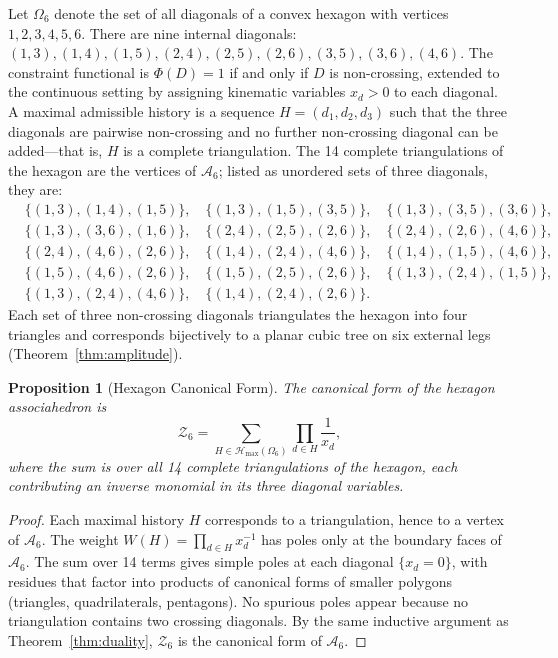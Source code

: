 \documentclass[11pt]{article}
\theoremstyle{plain}
\newtheorem{proposition}[theorem]{Proposition}
\theoremstyle{definition}
\theoremstyle{remark}
\newcommand{\Phif}{\Phi}
\newcommand{\OmKS}{\Omega}
\newcommand{\Hmax}{\mathcal{H}_{\max}}
\begin{document}
Let $\OmKS_6$ denote the set of all diagonals of a convex hexagon with vertices $1, 2, 3, 4, 5, 6$. There are nine internal diagonals: $(1,3), (1,4), (1,5), (2,4), (2,5), (2,6), (3,5), (3,6), (4,6)$. The constraint functional is $\Phif(D) = 1$ if and only if $D$ is non-crossing, extended to the continuous setting by assigning kinematic variables $x_d > 0$ to each diagonal. A maximal admissible history is a sequence $H = (d_1, d_2, d_3)$ such that the three diagonals are pairwise non-crossing and no further non-crossing diagonal can be added---that is, $H$ is a complete triangulation. The 14 complete triangulations of the hexagon are the vertices of $\mathcal{A}_6$; listed as unordered sets of three diagonals, they are:
\begin{align*}
  &\{(1,3),(1,4),(1,5)\},\quad
   \{(1,3),(1,5),(3,5)\},\quad
   \{(1,3),(3,5),(3,6)\},\\
  &\{(1,3),(3,6),(1,6)\},\quad
   \{(2,4),(2,5),(2,6)\},\quad
   \{(2,4),(2,6),(4,6)\},\\
  &\{(2,4),(4,6),(2,6)\},\quad
   \{(1,4),(2,4),(4,6)\},\quad
   \{(1,4),(1,5),(4,6)\},\\
  &\{(1,5),(4,6),(2,6)\},\quad
   \{(1,5),(2,5),(2,6)\},\quad
   \{(1,3),(2,4),(1,5)\},\\
  &\{(1,3),(2,4),(4,6)\},\quad
   \{(1,4),(2,4),(2,6)\}.
\end{align*}
Each set of three non-crossing diagonals triangulates the hexagon into four triangles and corresponds bijectively to a planar cubic tree on six external legs (Theorem~\ref{thm:amplitude}).

\begin{proposition}[Hexagon Canonical Form]
\label{prop:hexagon}
The canonical form of the hexagon associahedron is
\begin{equation}
\label{eq:hexagon-Z}
  \mathcal{Z}_6 = \sum_{H \in \Hmax(\OmKS_6)} \prod_{d \in H} \frac{1}{x_d},
\end{equation}
where the sum is over all 14 complete triangulations of the hexagon, each contributing an inverse monomial in its three diagonal variables.
\end{proposition}

\begin{proof}
Each maximal history $H$ corresponds to a triangulation, hence to a vertex of $\mathcal{A}_6$. The weight $W(H) = \prod_{d \in H} x_d^{-1}$ has poles only at the boundary faces of $\mathcal{A}_6$. The sum over 14 terms gives simple poles at each diagonal $\{x_d = 0\}$, with residues that factor into products of canonical forms of smaller polygons (triangles, quadrilaterals, pentagons). No spurious poles appear because no triangulation contains two crossing diagonals. By the same inductive argument as Theorem~\ref{thm:duality}, $\mathcal{Z}_6$ is the canonical form of $\mathcal{A}_6$.
\end{proof}
\end{document}
